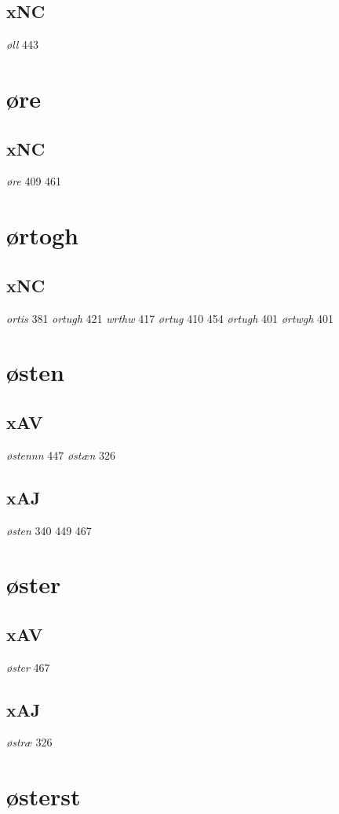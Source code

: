 \documentclass[a4paper,twocolumn]{article}
\begin{document}
\subsection{xNC}
\label{sec:org4c0b1b0}
\emph{øll} 443 
\section{øre}
\label{sec:org1b57f1c}
\subsection{xNC}
\label{sec:orga70e7c4}
\emph{øre} 409 461 
\section{ørtogh}
\label{sec:orgbe2cbf8}
\subsection{xNC}
\label{sec:org2331c22}
\emph{ortis} 381 \emph{ortugh} 421 \emph{wrthw} 417 \emph{ørtug} 410 454 \emph{ørtugh} 401 \emph{ørtwgh} 401 
\section{østen}
\label{sec:orgbd3aeb1}
\subsection{xAV}
\label{sec:org5c58905}
\emph{østennn} 447 \emph{østæn} 326 
\subsection{xAJ}
\label{sec:org30e50a8}
\emph{østen} 340 449 467 
\section{øster}
\label{sec:org21f63c1}
\subsection{xAV}
\label{sec:org8c4477e}
\emph{øster} 467 
\subsection{xAJ}
\label{sec:org8f02c5c}
\emph{østræ} 326 
\section{østerst}
\label{sec:orgf2bb4cd}
\end{document}
